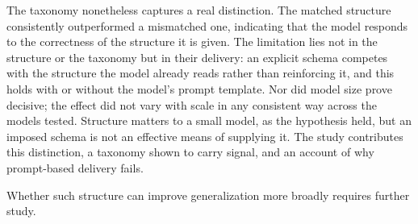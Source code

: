 \documentclass{article}
\begin{document}
The taxonomy nonetheless captures a real distinction. The matched structure consistently outperformed a mismatched one, indicating that the model responds to the correctness of the structure it is given. The limitation lies not in the structure or the taxonomy but in their delivery: an explicit schema competes with the structure the model already reads rather than reinforcing it, and this holds with or without the model's prompt template. Nor did model size prove decisive; the effect did not vary with scale in any consistent way across the models tested. Structure matters to a small model, as the hypothesis held, but an imposed schema is not an effective means of supplying it. The study contributes this distinction, a taxonomy shown to carry signal, and an account of why prompt-based delivery fails.

Whether such structure can improve generalization more broadly requires further study.



\end{document}
